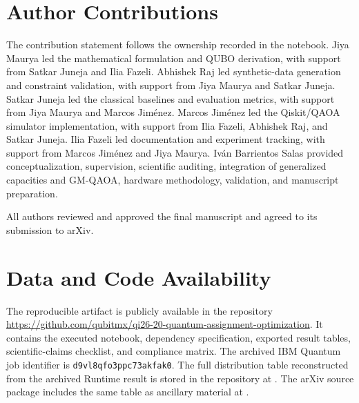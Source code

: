 \documentclass[11pt,a4paper]{article}
\newcommand{\QAOA}{\textsc{QAOA}}
\newcommand{\GMQAOA}{\textsc{GM-QAOA}}
\newcommand{\QUBO}{\textsc{QUBO}}
\begin{document}
\clearpage
\tableofcontents
\listoffigures
\listoftables
\clearpage












\section*{Author Contributions}
The contribution statement follows the ownership recorded in the notebook. Jiya Maurya led the mathematical formulation and \QUBO{} derivation, with support from Satkar Juneja and Ilia Fazeli. Abhishek Raj led synthetic-data generation and constraint validation, with support from Jiya Maurya and Satkar Juneja. Satkar Juneja led the classical baselines and evaluation metrics, with support from Jiya Maurya and Marcos Jiménez. Marcos Jiménez led the Qiskit/\QAOA{} simulator implementation, with support from Ilia Fazeli, Abhishek Raj, and Satkar Juneja. Ilia Fazeli led documentation and experiment tracking, with support from Marcos Jiménez and Jiya Maurya. Iván Barrientos Salas provided conceptualization, supervision, scientific auditing, integration of generalized capacities and \GMQAOA{}, hardware methodology, validation, and manuscript preparation.

All authors reviewed and approved the final manuscript and agreed to its
submission to arXiv.

\section*{Data and Code Availability}
The reproducible artifact is publicly available in the repository
\url{https://github.com/qubitmx/qi26-20-quantum-assignment-optimization}.
It contains the executed notebook, dependency specification, exported result tables, scientific-claims checklist, and compliance matrix. The archived IBM Quantum job identifier is \texttt{d9vl8qfo3ppc73akfak0}. The full distribution table reconstructed from the archived Runtime result is stored in the repository at . The arXiv source package includes the same table as ancillary material at .
\end{document}
